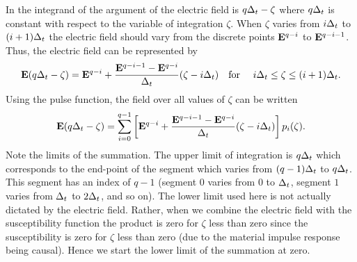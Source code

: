 In the integrand of  the argument of the
electric field is $q\Delta_t - \zeta$ where $q\Delta_t$ is constant with
respect to the variable of integration $\zeta$.  When $\zeta$ varies
from $i\Delta_t$ to $(i+1)\Delta_t$ the electric field should vary from the
discrete points $\mathbf{E}^{q-i}$ to $\mathbf{E}^{q-i-1}$.  Thus, the electric
field can be represented by
\begin{equation}
  \mathbf{E}(q\Delta_t-\zeta) = \mathbf{E}^{q-i} +
  \frac{\mathbf{E}^{q-i-1} - \mathbf{E}^{q-i}}{\Delta_t}(\zeta-i\Delta_t)
  \quad \mbox{for }\quad i\Delta_t\leq \zeta\leq (i+1)\Delta_t.
\end{equation}
Using the pulse function, the field over all values of $\zeta$ can be
written
\begin{equation}
  \mathbf{E}(q\Delta_t-\zeta) = \sum_{i=0}^{q-1}
    \left[\mathbf{E}^{q-i} +
          \frac{\mathbf{E}^{q-i-1}-\mathbf{E}^{q-i}}{\Delta_t}(\zeta-i\Delta_t)\right]
         p_i(\zeta).
  \label{eq:plrcESegments}
\end{equation}
Note the limits of the summation.  The upper limit of integration is
$q\Delta_t$ which corresponds to the end-point of the segment which
varies from $(q-1)\Delta_t$ to $q\Delta_t$.  This segment has an index of
$q-1$ (segment $0$ varies from $0$ to $\Delta_t$, segment $1$ varies from
$\Delta_t$ to $2\Delta_t$, and so on).  The lower limit used here is not
actually dictated by the electric field.  Rather, when we combine the
electric field with the susceptibility function the product is zero
for $\zeta$ less than zero since the susceptibility is zero for
$\zeta$ less than zero (due to the material impulse response being
causal).  Hence we start the lower limit of the summation at zero.

